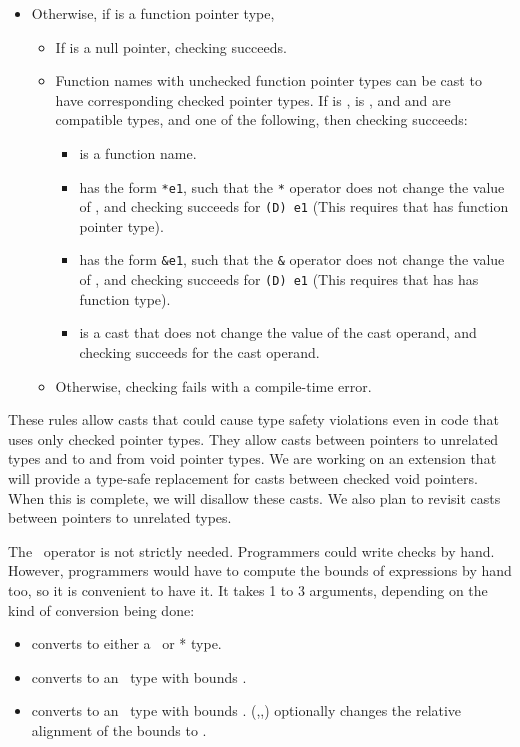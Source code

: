 \begin{itemize}
\item Otherwise, if  is a function pointer type,
\begin{itemize}
\item If  is a null pointer, checking succeeds.
\item Function names with unchecked function pointer types can be cast to have corresponding checked
pointer types.  If  is \ptrT,  is , and  and  are
compatible types, and one of the following, then checking succeeds:
\begin{itemize}
\item {} is a function name.
\item {} has the form \texttt{*e1}, such that the \texttt{*} operator does not change the value of ,
and checking succeeds for \texttt{(D) e1} (This requires that  has function pointer type).
\item {} has the form \texttt{\&e1}, such that the \texttt{\&} operator does not change the value of ,
and checking succeeds for \texttt{(D) e1} (This requires that  has has function type).
\item {} is a cast that does not change the value of the cast operand, and checking succeeds for the cast
operand.
\end{itemize}
\item Otherwise, checking fails with a compile-time error.
\end{itemize}
\end{itemize}

These rules allow casts that could cause type safety violations even in code
that uses only checked pointer types.  They allow casts between pointers to unrelated types
and to and from void pointer types.  We are working on an extension that will provide
a type-safe replacement for casts between checked void pointers.  When this is complete, we
will disallow these casts. We also plan to revisit casts between pointers to
unrelated types.

The \dynamicboundscast\ operator is not strictly needed.
Programmers could write checks by hand.  However, programmers
would have to compute the bounds of expressions by hand too, so it is convenient to
have it. It takes 1 to 3 arguments, depending on the kind of conversion being done:
\begin{itemize}
\item
  converts  to either a \ptr\ or * type.
\item
   converts  to an \arrayptr\ type with bounds .
\item
   converts  to an
  \arrayptr\ type with bounds
  .  
  {(,,)}
   optionally changes the relative alignment of the bounds to .
\end{itemize}


